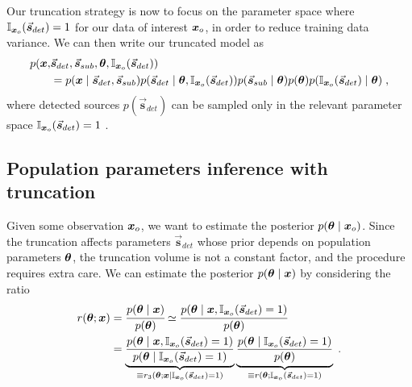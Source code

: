 Our truncation strategy is now to focus on the parameter space where $\mathbb{I}_{\bm{x}_o}(\vec{\boldsymbol{s}}_{det})=1$ for our data of interest $\bm{x}_o$, in order to reduce training data variance. 
We can then write our truncated model as 
\begin{equation}\label{eq:ps-truncatedmodel}
  \centering
\begin{split}
    p(\data, &\vec{\boldsymbol{s}}_{det}, \vec{\boldsymbol{s}}_{sub}, \interest,
    \mathbb{I}_{\data_o}(\vec{\boldsymbol{s}}_{det}))  \\ 
    &= p(\data\mid  \vec{\boldsymbol{s}}_{det}, \vec{\boldsymbol{s}}_{sub})
    p(\vec{\boldsymbol{s}}_{det}\mid \interest,\mathbb{I}_{\data_o}(\vec{\boldsymbol{s}}_{det}))
    p(\vec{\boldsymbol{s}}_{sub}\mid \interest) 
    p(\interest)
    p(\mathbb{I}_{\data_o}(\vec{\boldsymbol{s}}_{det})\mid \interest) \; ,
\end{split}
\end{equation}
where detected sources $p(\vec{\boldsymbol{s}}_{det})$ can be sampled only in the relevant parameter space  $\mathbb{I}_{\bm{x}_o}(\vec{\boldsymbol{s}}_{det})=1$ .

\subsection{Population parameters inference with truncation}  \label{subsec:ps-pop}
Given some observation $\bm{x}_o$, we want to estimate the posterior $p(\bm{\theta}\mid \bm{x}_o)$. Since the truncation affects parameters $\vec{\boldsymbol{s}}_{det}$ whose prior depends on population parameters $\bm{\theta}$, the truncation volume is not a constant factor, and the procedure requires extra care. We can estimate the posterior $p(\bm{\theta}\mid \bm{x})$ by considering the ratio
\begin{equation}\label{eq:ps-posterior}
\centering
\begin{split}
    r(\interest; \data) &= \cfrac{p(\interest\mid \data)}{p(\interest)} \simeq \cfrac{p(\interest\mid \data, \mathbb{I}_{\data_o}(\vec{\boldsymbol{s}}_{det})=1)}{p(\interest)} \\
    &= 
    \underbrace{\frac{p(\interest\mid \data, \mathbb{I}_{\data_o}(\vec{\boldsymbol{s}}_{det})=1)}{p(\interest\mid \mathbb{I}_{\data_o}(\vec{\boldsymbol{s}}_{det})=1)}}_{\equiv { r_3(\interest; \data\mid \mathbb{I}_{\data_o}(\vec{\boldsymbol{s}}_{det})=1)}}
    \underbrace{\frac{p(\interest\mid \mathbb{I}_{\data_o}(\vec{\boldsymbol{s}}_{det})=1)}{p(\interest)}}_{\equiv
    r(\interest; \mathbb{I}_{\data_o}(\vec{\boldsymbol{s}}_{det})=1)}\;.
\end{split}
\end{equation}

